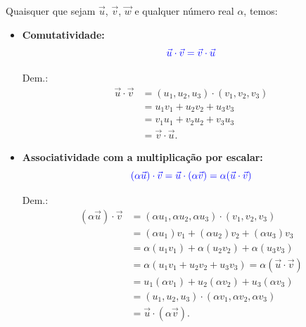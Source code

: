 Quaisquer que sejam $\vec{u}$, $\vec{v}$, $\vec{w}$ e qualquer número real $\alpha$, temos:
\begin{itemize}
\item {\bf Comutatividade:}
  \begin{equation}
    {\color{blue}\vec{u}\cdot\vec{v}=\vec{v}\cdot\vec{u}}
  \end{equation}

  Dem.:
  \begin{align}
    \vec{u}\cdot\vec{v} &= (u_1,u_2,u_3)\cdot(v_1,v_2,v_3)\\
                        &= u_1v_1+u_2v_2+u_3v_3 \\
                        &= v_1u_1+v_2u_2+v_3u_3 \\
                        &= \vec{v}\cdot\vec{u}.
  \end{align}

\item {\bf Associatividade com a multiplicação por escalar:}
  \begin{equation}
    {\color{blue}(\alpha\vec{u})\cdot\vec{v}=\vec{u}\cdot(\alpha\vec{v})=\alpha(\vec{u}\cdot\vec{v})}
\end{equation}

  Dem.:
  \begin{align}
    (\alpha\vec{u})\cdot\vec{v} &= (\alpha u_1,\alpha u_2, \alpha u_3)\cdot (v_1,v_2,v_3)\\
                                &= (\alpha u_1)v_1+(\alpha u_2)v_2 + (\alpha u_3)v_3 \\
                                &= \alpha (u_1v_1)+\alpha (u_2v_2)+\alpha (u_3v_3) \\
                                &= \alpha (u_1v_1+u_2v_2+u_3v_3) = \alpha(\vec{u}\cdot\vec{v})\\
                                &= u_1(\alpha v_1) + u_2(\alpha v_2) + u_3(\alpha v_3) \\
                                &= (u_1,u_2,u_3)\cdot(\alpha v_1,\alpha v_2,\alpha v_3) \\
                                &= \vec{u}\cdot(\alpha\vec{v}).
  \end{align}


\end{itemize}
